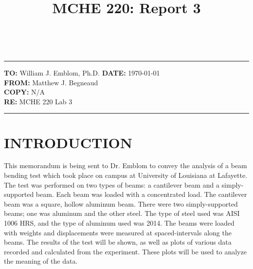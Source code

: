 \documentclass[12pt]{article}
\title{MCHE 220: Report 3}
\begin{document}
\raggedright     %
\fancyhf{} 	
	\renewcommand{\headrulewidth}{0pt}
  	\pagestyle{plain}
    
\captionsetup[table]{labelsep=space}

\begin{flushleft}
\hrulefill\\\hrule height 1pt
\vspace{5pt}
\textbf{TO: }William J. Emblom, Ph.D.  \hfill   \textbf{DATE: }\today                
\bigskip\\
\textbf{FROM: }Matthew J. Begneaud
\bigskip\\
\textbf{COPY: }N/A
\bigskip\\
\textbf{RE: }MCHE 220 Lab 3
\vspace{-10pt}
\end{flushleft}
\hrulefill \hrule height 1pt


\section*{\fontsize{12}{12}\selectfont INTRODUCTION}
This memorandum is being sent to Dr. Emblom to convey the analysis of a beam bending test which took place on campus at University of Louisiana at Lafayette. The test was performed on two types of beams: a cantilever beam and a simply-supported beam. Each beam was loaded with a concentrated load. The cantilever beam was a square, hollow aluminum beam. There were two simply-supported beams; one was aluminum and the other steel. The type of steel used was AISI 1006 HRS, and the type of aluminum used was 2014. The beams were loaded with weights and displacements were measured at spaced-intervals along the beams. The results of the test will be shown, as well as plots of various data recorded and calculated from the experiment. These plots will be used to analyze the meaning of the data.
\bigskip
\end{document}
